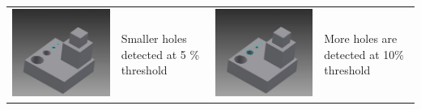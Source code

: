 \begin{longtable}{ | C{0.25\textwidth}  L{0.25\textwidth} || C{0.25\textwidth}  L{0.25\textwidth}|}
\includegraphics[scale=0.236]{..//Common/images//defeat3.png} &
Smaller holes detected at 5 \% threshold &
\includegraphics[scale=0.236]{..//Common/images//defeat4.png} &
More holes are detected at 10\%  threshold\\



\end{longtable}
